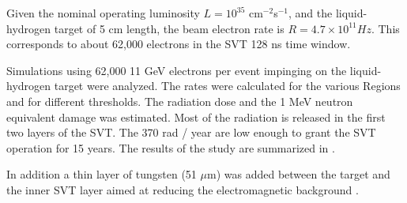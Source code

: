 Given the nominal operating luminosity $L=10^{35}$ cm$^{-2}$s$^{-1}$, and the liquid-hydrogen target of 5 cm length, the beam electron rate
is $R=4.7 \times 10^{11} Hz$. This corresponds to about 62,000 electrons in the SVT 128 ns time window.

Simulations using 62,000 11 GeV electrons per event impinging on the liquid-hydrogen target were analyzed.
The rates were calculated for the various Regions and for different thresholds.
The radiation dose and the 1 MeV neutron equivalent damage was estimated. Most of the radiation
is released in the first two layers of the SVT.
The 370 rad / year are low enough to grant the SVT operation for 15 years. The results of the study
are summarized in .

In addition a thin layer of tungsten (51 $\mu$m) was added between the target and the inner SVT layer aimed at reducing the electromagnetic
background \cite{bstDose}.


